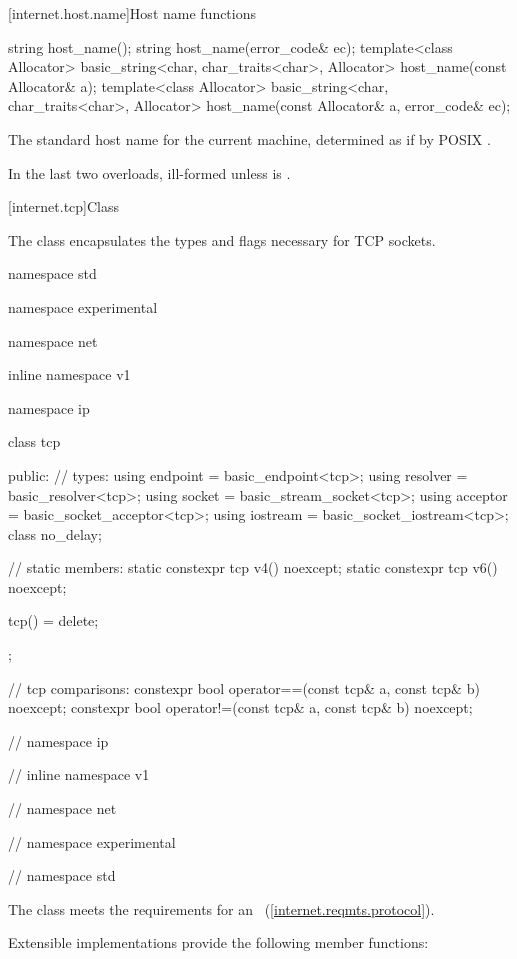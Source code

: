 [internet.host.name]{Host name functions}

%
\begin{itemdecl}
string host_name();
string host_name(error_code& ec);
template<class Allocator>
  basic_string<char, char_traits<char>, Allocator>
    host_name(const Allocator& a);
template<class Allocator>
  basic_string<char, char_traits<char>, Allocator>
    host_name(const Allocator& a, error_code& ec);
\end{itemdecl}

\begin{itemdescr}
\pnum
\returns The standard host name for the current machine, determined as if by POSIX .

\pnum
\remarks In the last two overloads, ill-formed unless  is .
\end{itemdescr}



%
[internet.tcp]{Class }

\pnum
The class  encapsulates the types and flags necessary for TCP sockets.

\begin{codeblock}
namespace std {
namespace experimental {
namespace net {
inline namespace v1 {
namespace ip {

  class tcp
  {
  public:
    // types:
    using endpoint = basic_endpoint<tcp>;
    using resolver = basic_resolver<tcp>;
    using socket = basic_stream_socket<tcp>;
    using acceptor = basic_socket_acceptor<tcp>;
    using iostream = basic_socket_iostream<tcp>;
    class no_delay;

    // static members:
    static constexpr tcp v4() noexcept;
    static constexpr tcp v6() noexcept;

    tcp() = delete;
  };

  // tcp comparisons:
  constexpr bool operator==(const tcp& a, const tcp& b) noexcept;
  constexpr bool operator!=(const tcp& a, const tcp& b) noexcept;

} // namespace ip
} // inline namespace v1
} // namespace net
} // namespace experimental
} // namespace std
\end{codeblock}

\pnum
The  class meets the requirements for an ~(\ref{internet.reqmts.protocol}).

%
\pnum
 Extensible implementations provide the following member functions:

